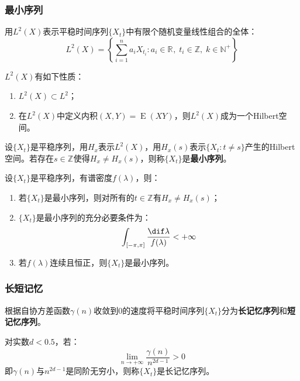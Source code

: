 \subsubsection{最小序列}
\begin{definition}
	用$L^2(X)$表示平稳时间序列$\{X_t\}$中有限个随机变量线性组合的全体：
	\begin{equation*}
		L^2(X)=\left\{\sum_{i=1}^{n}a_iX_{t_i}:a_i\in\mathbb{R}^{},\;t_i\in\mathbb{Z},\;k\in\mathbb{N}^+\right\}
	\end{equation*}
\end{definition}
\begin{property}\label{prop:L2TSX}
	$L^2(X)$有如下性质：
	\begin{enumerate}
		\item $L^2(X)\subset L^2$；
		\item 在$L^2(X)$中定义内积$(X,Y)=\operatorname{E}(XY)$，则$L^2(X)$成为一个Hilbert空间。
	\end{enumerate}
\end{property}
\begin{definition}
	设$\{X_t\}$是平稳序列，用$H_x$表示$L^2(X)$，用$H_x(s)$表示$\{X_t:t\ne s\}$产生的Hilbert空间。若存在$s\in\mathbb{Z}^{}$使得$H_x\ne H_x(s)$，则称$\{X_t\}$是\textbf{最小序列}。
\end{definition}
\begin{property}
	设$\{X_t\}$是平稳序列，有谱密度$f(\lambda)$，则：
	\begin{enumerate}
		\item 若$\{X_t\}$是最小序列，则对所有的$t\in\mathbb{Z}^{}$有$H_x\ne H_x(s)$；
		\item $\{X_t\}$是最小序列的充分必要条件为：
		\begin{equation*}
			\int_{[-\pi,\pi]}\frac{\dif\lambda}{f(\lambda)}<+\infty
		\end{equation*}
		\item 若$f(\lambda)$连续且恒正，则$\{X_t\}$是最小序列。
	\end{enumerate}
\end{property}
\subsubsection{长短记忆}
\begin{definition}
	根据自协方差函数$\gamma(n)$收敛到$0$的速度将平稳时间序列$\{X_t\}$分为\textbf{长记忆序列}和\textbf{短记忆序列}。\par
	对实数$d<0.5$，若：
	\begin{equation*}
		\lim_{n\to+\infty}\frac{\gamma(n)}{n^{2d-1}}>0
	\end{equation*}
	即$\gamma(n)$与$n^{2d-1}$是同阶无穷小，则称$\{X_t\}$是长记忆序列。
\end{definition}

